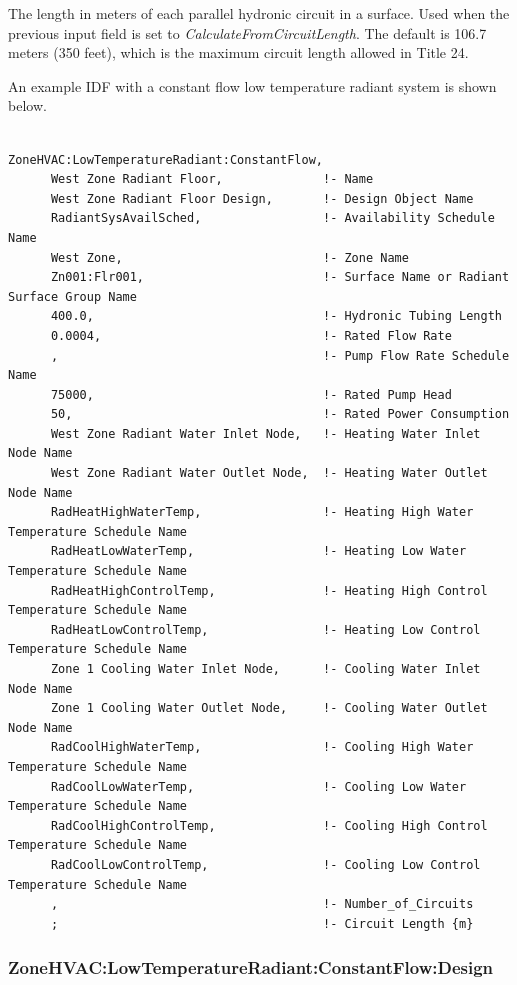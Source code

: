 The length in meters of each parallel hydronic circuit in a surface. Used when the previous input field is set to \emph{CalculateFromCircuitLength}. The default is 106.7 meters (350 feet), which is the maximum circuit length allowed in Title 24.

An example IDF with a constant flow low temperature radiant system is shown below.

\begin{lstlisting}

ZoneHVAC:LowTemperatureRadiant:ConstantFlow,
      West Zone Radiant Floor,              !- Name
      West Zone Radiant Floor Design,       !- Design Object Name
      RadiantSysAvailSched,                 !- Availability Schedule Name
      West Zone,                            !- Zone Name
      Zn001:Flr001,                         !- Surface Name or Radiant Surface Group Name
      400.0,                                !- Hydronic Tubing Length
      0.0004,                               !- Rated Flow Rate
      ,                                     !- Pump Flow Rate Schedule Name
      75000,                                !- Rated Pump Head
      50,                                   !- Rated Power Consumption
      West Zone Radiant Water Inlet Node,   !- Heating Water Inlet Node Name
      West Zone Radiant Water Outlet Node,  !- Heating Water Outlet Node Name
      RadHeatHighWaterTemp,                 !- Heating High Water Temperature Schedule Name
      RadHeatLowWaterTemp,                  !- Heating Low Water Temperature Schedule Name
      RadHeatHighControlTemp,               !- Heating High Control Temperature Schedule Name
      RadHeatLowControlTemp,                !- Heating Low Control Temperature Schedule Name
      Zone 1 Cooling Water Inlet Node,      !- Cooling Water Inlet Node Name
      Zone 1 Cooling Water Outlet Node,     !- Cooling Water Outlet Node Name
      RadCoolHighWaterTemp,                 !- Cooling High Water Temperature Schedule Name
      RadCoolLowWaterTemp,                  !- Cooling Low Water Temperature Schedule Name
      RadCoolHighControlTemp,               !- Cooling High Control Temperature Schedule Name
      RadCoolLowControlTemp,                !- Cooling Low Control Temperature Schedule Name
      ,                                     !- Number_of_Circuits
      ;                                     !- Circuit Length {m}
\end{lstlisting}

\subsubsection{ZoneHVAC:LowTemperatureRadiant:ConstantFlow:Design}\label{ConstFlowDesign}

